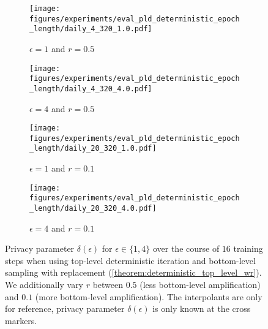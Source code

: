 \begin{figure*}[ht!]
\centering
\vskip 0.2in
    \begin{subfigure}{0.49\textwidth}
        \texttt{[image: figures/experiments/eval\_pld\_deterministic\_epoch\_length/daily\_4\_320\_1.0.pdf]}
        \caption{$\epsilon=1$ and $r=0.5$}
    \end{subfigure}
    \hfill
    \begin{subfigure}{0.49\textwidth}
        \texttt{[image: figures/experiments/eval\_pld\_deterministic\_epoch\_length/daily\_4\_320\_4.0.pdf]}
        \caption{$\epsilon=4$ and $r=0.5$}
    \end{subfigure}
    \begin{subfigure}{0.49\textwidth}
        \texttt{[image: figures/experiments/eval\_pld\_deterministic\_epoch\_length/daily\_20\_320\_1.0.pdf]}
        \caption{$\epsilon=1$ and $r=0.1$}
    \end{subfigure}
    \hfill
    \begin{subfigure}{0.49\textwidth}
        \texttt{[image: figures/experiments/eval\_pld\_deterministic\_epoch\_length/daily\_20\_320\_4.0.pdf]}
        \caption{$\epsilon=4$ and $r=0.1$}
    \end{subfigure}
    \caption{
    Privacy parameter $\delta(\epsilon)$ for $\epsilon \in \{1,4\}$ over the course of $16$ training steps when using top-level deterministic iteration and bottom-level sampling with replacement (\cref{theorem:deterministic_top_level_wr}).
    We additionally vary $r$ between $0.5$ (less bottom-level amplification) and $0.1$ (more bottom-level amplification).
    The interpolants are only for reference, privacy parameter $\delta(\epsilon)$ is only known at the cross markers.
    }
    \label{fig:appendix_epoch_privacy_vs_length}
\vskip -0.2in
\end{figure*}